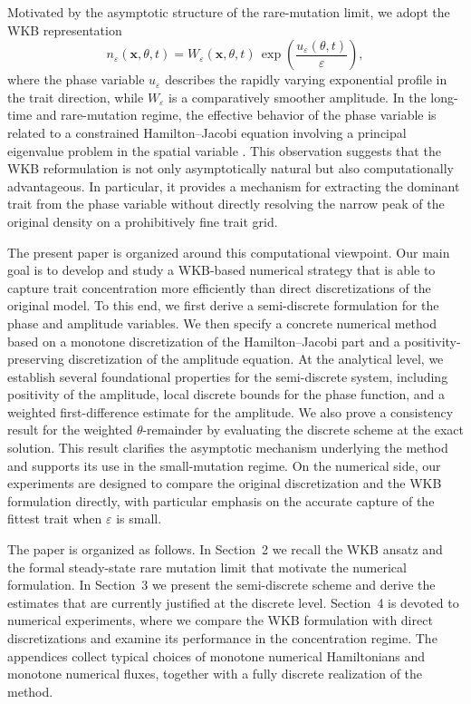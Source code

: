 \documentclass[11pt, dina4, amsfont12]{article}
\begin{document}
Motivated by the asymptotic structure of the rare-mutation limit, we adopt the WKB representation
\[
n_\varepsilon(\mathbf{x},\theta,t)
=
W_\varepsilon(\mathbf{x},\theta,t)\,
\exp\!\left(\frac{u_\varepsilon(\theta,t)}{\varepsilon}\right),
\]
where the phase variable $u_\varepsilon$ describes the rapidly varying exponential profile in the trait direction, while $W_\varepsilon$ is a comparatively smoother amplitude. In the long-time and rare-mutation regime, the effective behavior of the phase variable is related to a constrained Hamilton--Jacobi equation involving a principal eigenvalue problem in the spatial variable \cite{PerthameSouganidis,AlmeidaPerthameRuan}. This observation suggests that the WKB reformulation is not only asymptotically natural but also computationally advantageous. In particular, it provides a mechanism for extracting the dominant trait from the phase variable without directly resolving the narrow peak of the original density on a prohibitively fine trait grid.

The present paper is organized around this computational viewpoint. Our main goal is to develop and study a WKB-based numerical strategy that is able to capture trait concentration more efficiently than direct discretizations of the original model. To this end, we first derive a semi-discrete formulation for the phase and amplitude variables. We then specify a concrete numerical method based on a monotone discretization of the Hamilton--Jacobi part and a positivity-preserving discretization of the amplitude equation. At the analytical level, we establish several foundational properties for the semi-discrete system, including positivity of the amplitude, local discrete bounds for the phase function, and a weighted first-difference estimate for the amplitude. We also prove a consistency result for the weighted $\theta$-remainder by evaluating the discrete scheme at the exact solution. This result clarifies the asymptotic mechanism underlying the method and supports its use in the small-mutation regime. On the numerical side, our experiments are designed to compare the original discretization and the WKB formulation directly, with particular emphasis on the accurate capture of the fittest trait when $\varepsilon$ is small.

The paper is organized as follows. In Section~2 we recall the WKB ansatz and the formal steady-state rare mutation limit that motivate the numerical formulation. In Section~3 we present the semi-discrete scheme and derive the estimates that are currently justified at the discrete level. Section~4 is devoted to numerical experiments, where we compare the WKB formulation with direct discretizations and examine its performance in the concentration regime. The appendices collect typical choices of monotone numerical Hamiltonians and monotone numerical fluxes, together with a fully discrete realization of the method.
\end{document}
